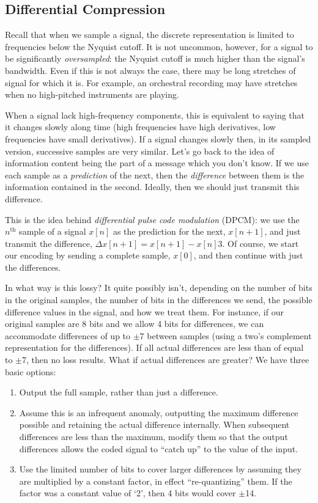 \subsection{Differential Compression}

Recall that when we sample a signal, the discrete representation is
limited to frequencies below the Nyquist cutoff.  It is not uncommon,
however, for a signal to be significantly \emph{oversampled}: the
Nyquist cutoff is much higher than the signal's bandwidth.  Even if
this is not always the case, there may be long stretches of signal for
which it is.  For example, an orchestral recording may have stretches
when no high-pitched instruments are playing.

When a signal lack high-frequency components, this is equivalent to
saying that it changes slowly along time (high frequencies have high
derivatives, low frequencies have small derivatives).  If a signal
changes slowly then, in its sampled version, successive samples are
very similar. Let's go back to the idea of information content being
the part of a message which you don't know.  If we use each sample as
a \emph{prediction} of the next, then the \emph{difference} between
them is the information contained in the second. Ideally, then we
should just transmit this difference.

This is the idea behind \emph{differential pulse code modulation}
(DPCM): we use the $n^\mathrm{th}$ sample of a signal $x[n]$ as the
prediction for the next, $x[n+1]$, and just transmit the difference,
$\Delta x[n+1] = x[n+1] - x[n]3$. Of course, we start our encoding by
sending a complete sample, $x[0]$, and then continue with just the
differences.

In what way is this lossy? It quite possibly isn't, depending on the
number of bits in the original samples, the number of bits in the
differences we send, the possible difference values in the signal, and
how we treat them.  For instance, if our original samples are 8 bits
and we allow 4 bits for differences, we can accommodate differences of
up to $\pm$7 between samples (using a two's complement representation
for the differences).  If all actual differences are less than of
equal to $\pm$7, then no loss results.  What if actual differences are
greater?  We have three basic options:
\begin{enumerate}
\item Output the full sample, rather than just a difference.
\item Assume this is an infrequent anomaly, outputting the maximum
  difference possible and retaining the actual difference internally.
  When subsequent differences are less than the maximum, modify them
  so that the output differences allows the coded signal to ``catch
  up'' to the value of the input.
\item Use the limited number of bits to cover larger differences by
  assuming they are multiplied by a constant factor, in effect
  ``re-quantizing'' them. If the factor was a constant value of `2',
  then 4 bits would cover $\pm$14.
\end{enumerate}

